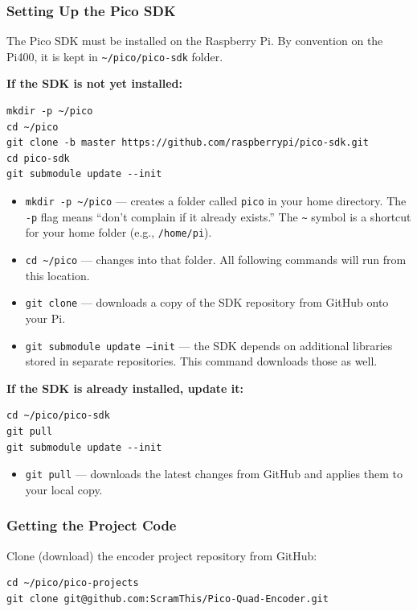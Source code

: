 \documentclass[main.tex]{subfiles}
\begin{document}
\subsubsection{Setting Up the Pico SDK}

The Pico SDK must be installed on the Raspberry Pi. By convention on the Pi400, it is kept in \texttt{\textasciitilde/pico/pico-sdk} folder.

\textbf{If the SDK is not yet installed:}
\begin{verbatim}
mkdir -p ~/pico
cd ~/pico
git clone -b master https://github.com/raspberrypi/pico-sdk.git
cd pico-sdk
git submodule update --init
\end{verbatim}

\begin{itemize}
    \item \texttt{mkdir -p \textasciitilde/pico} --- creates a folder called \texttt{pico} in your home directory. The \texttt{-p} flag means ``don't complain if it already exists.'' The \texttt{\textasciitilde} symbol is a shortcut for your home folder (e.g., \texttt{/home/pi}).
    \item \texttt{cd \textasciitilde/pico} --- changes into that folder. All following commands will run from this location.
    \item \texttt{git clone} --- downloads a copy of the SDK repository from GitHub onto your Pi.
    \item \texttt{git submodule update --init} --- the SDK depends on additional libraries stored in separate repositories. This command downloads those as well.
\end{itemize}

\textbf{If the SDK is already installed, update it:}
\begin{verbatim}
cd ~/pico/pico-sdk
git pull
git submodule update --init
\end{verbatim}

\begin{itemize}
    \item \texttt{git pull} --- downloads the latest changes from GitHub and applies them to your local copy.
\end{itemize}

\subsubsection{Getting the Project Code}

Clone (download) the encoder project repository from GitHub:
\begin{verbatim}
cd ~/pico/pico-projects
git clone git@github.com:ScramThis/Pico-Quad-Encoder.git
\end{verbatim}
\end{document}
